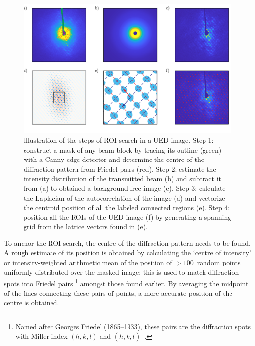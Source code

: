 \begin{figure}[t!]
  \centering
  \includegraphics[width = \textwidth]{Figures/fig_UED_rlattice.pdf}
  \caption[Illustration of the steps of ROI search in a UED image.]{
  Illustration of the steps of ROI search in a UED image.
  Step 1: construct a mask of any beam block by tracing its outline (green) with a Canny edge detector
  and determine the centre of the diffraction pattern from Friedel pairs (red).
  Step 2: estimate the intensity distribution of the transmitted beam (b)
  and subtract it from (a) to obtained a background-free image (c).
  Step 3: calculate the Laplacian of the autocorrelation of the image (d)
  and vectorize the centroid position of all the labeled connected regions (e).
  Step 4: position all the ROIs of the UED image (f)
  by generating a spanning grid from the lattice vectors found in (e).
  }
  \label{fig: UED-rlattice}
\end{figure}

To anchor the ROI search, the centre of the diffraction pattern needs to be found.
A rough estimate of its position is obtained by calculating the `centre of intensity' or
intensity-weighted arithmetic mean of the position of $>100$~random points
uniformly distributed over the masked image;
this is used to match diffraction spots into Friedel pairs%
\footnote{Named after Georges Friedel (1865--1933),
these pairs are the diffraction spots with Miller index $(h, k, l)$ and
$(\bar{h}, \bar{k}, \bar{l} )$~\cite{XRDBook}.}
amongst those found earlier.
By averaging the midpoint of the lines connecting these pairs of points,
a more accurate position of the centre is obtained.

